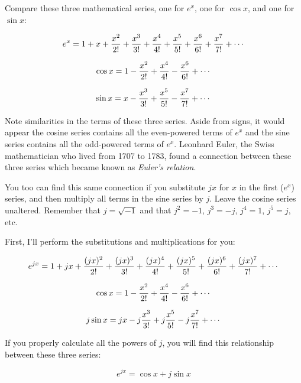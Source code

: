 

Compare these three mathematical series, one for $e^x$, one for $\cos x$, and one for $\sin x$:

$$e^x = 1 + x + {x^2 \over 2!} + {x^3 \over 3!} + {x^4 \over 4!} + {x^5 \over 5!} + {x^6 \over 6!} + {x^7 \over 7!} + \cdots $$

$$\cos x = 1 - {x^2 \over 2!} + {x^4 \over 4!} - {x^6 \over 6!} + \cdots $$

$$\sin x = x - {x^3 \over 3!} + {x^5 \over 5!} - {x^7 \over 7!} + \cdots $$

Note similarities in the terms of these three series.  Aside from signs, it would appear the cosine series contains all the even-powered terms of $e^x$ and the sine series contains all the odd-powered terms of $e^x$.  Leonhard Euler, the Swiss mathematician who lived from 1707 to 1783, found a connection between these three series which became known as {\it Euler's relation}.

You too can find this same connection if you substitute $jx$ for $x$ in the first ($e^x$) series, and then multiply all terms in the sine series by $j$.  Leave the cosine series unaltered.  Remember that $j = \sqrt{-1}$ and that $j^2 = -1$, $j^3 = -j$, $j^4 = 1$, $j^5 = j$, etc.







First, I'll perform the substitutions and multiplications for you:

$$e^{jx} = 1 + jx + {(jx)^2 \over 2!} + {(jx)^3 \over 3!} + {(jx)^4 \over 4!} + {(jx)^5 \over 5!} + {(jx)^6 \over 6!} + {(jx)^7 \over 7!} + \cdots $$

$$\cos x = 1 - {x^2 \over 2!} + {x^4 \over 4!} - {x^6 \over 6!} + \cdots $$

$$j \sin x = jx - j{x^3 \over 3!} + j{x^5 \over 5!} - j{x^7 \over 7!} + \cdots $$

\vskip 10pt

If you properly calculate all the powers of $j$, you will find this relationship between these three series:

$$e^{jx} = \cos x + j \sin x$$






